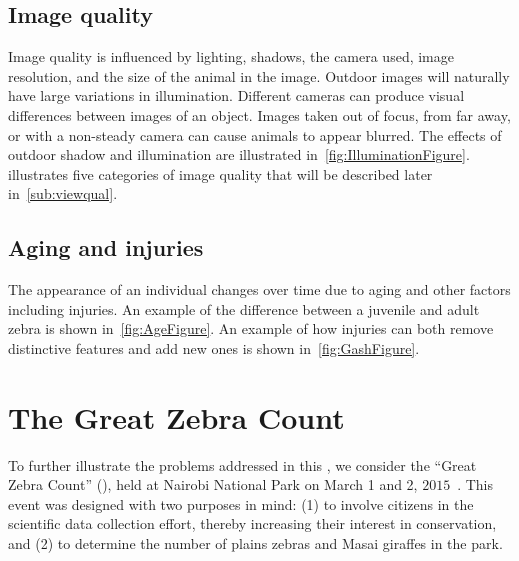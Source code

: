     \subsection{Image quality}
        Image quality is influenced by lighting, shadows, the camera used, image resolution, and the size of the
        animal in the image. Outdoor images will naturally have large variations in illumination. Different cameras
        can produce visual differences between images of an object. Images taken out of focus, from far away, or
        with a non-steady camera can cause animals to appear blurred. The effects of outdoor shadow and
        illumination are illustrated in~\cref{fig:IlluminationFigure}.  illustrates five
        categories of image quality that will be described later in~\cref{sub:viewqual}.

        \IlluminationFigure{}

        \QualityFigure{}

    \FloatBarrier{}
    \subsection{Aging and injuries}
        The appearance of an individual changes over time due to aging and other factors including injuries. An example
        of the difference between a juvenile and adult zebra is shown in~\cref{fig:AgeFigure}. An example of how
        injuries can both remove distinctive features and add new ones is shown in~\cref{fig:GashFigure}.

        \AgeFigure{}

        \GashFigure{}

\FloatBarrier{}
\section{The Great Zebra Count}\label{sec:introgzc}

    To further illustrate the problems addressed in this \thesis{}, we consider the ``Great Zebra Count'' (\GZC{}),
    held at Nairobi National Park on March 1\st{} and 2\nd{}, $2015$~\cite{rubenstein_great_2015}. This event was
    designed with two purposes in mind: (1) to involve citizens in the scientific data collection effort, thereby
    increasing their interest in conservation, and (2) to determine the number of plains zebras and Masai giraffes
    in the park.

